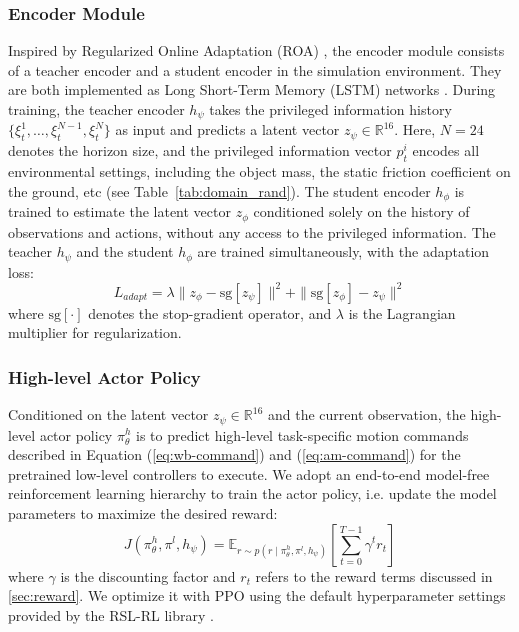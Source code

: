 \subsubsection{Encoder Module}
Inspired by Regularized Online Adaptation (ROA) \cite{fu2022deepwholebodycontrollearning}, the encoder module consists of a teacher encoder and a student encoder in the simulation environment. They are both implemented as Long Short-Term Memory (LSTM) networks \cite{hochreiter1997long}. During training, the teacher encoder $h_\psi$ takes the privileged information history $\{\xi_t^1, \dots, \xi_t^{N-1}, \xi_t^N\}$ as input and predicts a latent vector $z_\psi \in \mathbb{R}^{16}$. Here, $N=24$ denotes the horizon size, and the privileged information vector $p_t^i$ encodes all environmental settings, including the object mass, the static friction coefficient on the ground, etc (see Table~\ref{tab:domain_rand}). The student encoder $h_\phi$ is trained to estimate the latent vector $z_\phi$ conditioned solely on the history of observations and actions, without any access to the privileged information. The teacher $h_\psi$ and the student $h_\phi$ are trained simultaneously, with the adaptation loss:
\begin{equation}
\label{eq:adapt}
L_{adapt}=  \lambda \| z_\phi - \text{sg}[z_\psi] \|^2 + \| \text{sg}[z_\phi] - z_\psi \|^2
\end{equation}
where $\text{sg}[\cdot]$ denotes the stop-gradient operator, and $\lambda$ is the Lagrangian multiplier for regularization.
\subsubsection{High-level Actor Policy}
Conditioned on the latent vector $z_\psi\in \mathbb{R}^{16}$ and the current observation, the high-level actor policy $\pi_{\theta}^h$ is to predict high-level task-specific motion commands described in Equation (\ref{eq:wb-command}) and (\ref{eq:am-command}) for the pretrained low-level controllers to execute. We adopt an end-to-end model-free reinforcement learning hierarchy to train the actor policy, i.e. update the model parameters to maximize the desired reward:
\begin{equation}
    J(\pi_\theta^h, \pi^l, h_\psi) = \mathbb{E}_{r \sim p(r \mid \pi^h_\theta, \pi^l, h_\psi)}\left[ \sum_{t=0}^{T-1}\gamma^t r_t \right] \label{eq:ppo}
\end{equation}
where $\gamma$ is the discounting factor and $r_t$ refers to the reward terms discussed in \ref{sec:reward}. We optimize it with PPO \cite{schulman2017proximalpolicyoptimizationalgorithms} using the default hyperparameter settings provided by the RSL-RL library \cite{schwarke2025rsl}.

